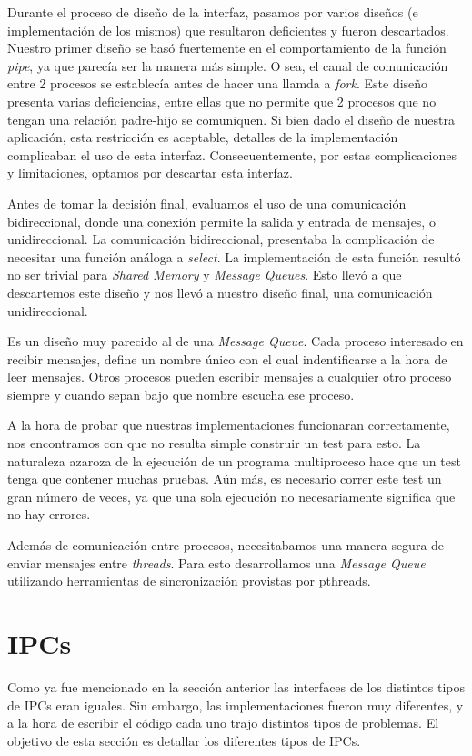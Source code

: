 \documentclass[a4paper,10pt]{article}
\begin{document}
Durante el proceso de diseño de la interfaz, pasamos por varios diseños (e implementación de los mismos) que resultaron deficientes y fueron descartados.
Nuestro primer diseño se basó fuertemente en el comportamiento de la función \textit{pipe}, ya que parecía ser la manera más simple.
O sea, el canal de comunicación entre 2 procesos se establecía antes de hacer una llamda a \textit{fork}.
Este diseño presenta varias deficiencias, entre ellas que no permite que 2 procesos que no tengan una relación padre-hijo se comuniquen.
Si bien dado el diseño de nuestra aplicación, esta restricción es aceptable, detalles de la implementación complicaban el uso de esta interfaz.
Consecuentemente, por estas complicaciones y limitaciones, optamos por descartar esta interfaz.

Antes de tomar la decisión final, evaluamos el uso de una comunicación bidireccional, donde una conexión permite la salida y entrada de mensajes, o unidireccional.
La comunicación bidireccional, presentaba la complicación de necesitar una función análoga a \textit{select}.
La implementación de esta función resultó no ser trivial para \textit{Shared Memory} y \textit{Message Queues}.
Esto llevó a que descartemos este diseño y nos llevó a nuestro diseño final, una comunicación unidireccional.

Es un diseño muy parecido al de una \textit{Message Queue}.
Cada proceso interesado en recibir mensajes, define un nombre único con el cual indentificarse a la hora de leer mensajes.
Otros procesos pueden escribir mensajes a cualquier otro proceso siempre y cuando sepan bajo que nombre escucha ese proceso.

A la hora de probar que nuestras implementaciones funcionaran correctamente, nos encontramos con que no resulta simple construir un test para esto.
La naturaleza azaroza de la ejecución de un programa multiproceso hace que un test tenga que contener muchas pruebas.
Aún más, es necesario correr este test un gran número de veces, ya que una sola ejecución no necesariamente significa que no hay errores.

Además de comunicación entre procesos, necesitabamos una manera segura de enviar mensajes entre \textit{threads}.
Para esto desarrollamos una \textit{Message Queue} utilizando herramientas de sincronización provistas por pthreads.

\newpage
\section{IPCs}
Como ya fue mencionado en la sección anterior las interfaces de los distintos tipos de IPCs eran iguales.
Sin embargo, las implementaciones fueron muy diferentes, y a la hora de escribir el código cada uno trajo
distintos tipos de problemas. El objetivo de esta sección es detallar los diferentes tipos de IPCs.
\end{document}
